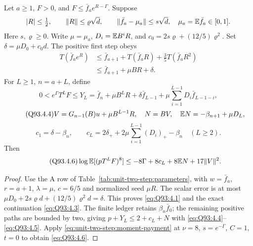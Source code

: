 \begin{lemma}
\label{lem:oc:anchored-eighth}
Let \(a\ge1\), \(F>0\), and
\(F\le\bar f_a e^{R-\Gamma}\). Suppose
\[
 |R|\le\tfrac12,\qquad \|R\|\le\varrho\sqrt d,\qquad
 \|\bar f_a-\mu_a\|\le s\sqrt d,
 \quad \mu_a=\mathbb E\bar f_a\in[0,1].
\]
Here \(s,\varrho\ge0\).
Write \(\mu=\mu_a\), \(D_i=\mathbb E B^iR\), and
\(c_0=2s\varrho+(12/5)\varrho^2\). Set
\(\delta=\mu D_0+c_0d\). The positive first step obeys
\begin{equation}\tag{Q93.4.1}\label{eq:Q93:4.1}
 \begin{aligned}
 T(\bar f_ae^R)&\le\bar f_{a+1}+T(\bar f_aR)
                         +\tfrac35T(\bar f_aR^2)\\
 &\le\bar f_{a+1}+\mu BR+\delta.
 \end{aligned}
\end{equation}
For \(L\ge1\), \(n=a+L\), define
\begin{equation}\tag{Q93.4.3}\label{eq:Q93:4.3}
 0<e^\Gamma T^LF\le Y_L
 =\bar f_n+\mu B^LR+\delta\bar f_{L-1}
       +\mu\sum_{i=1}^{L-1}D_i\bar f_{L-1-i},
\end{equation}
\begin{equation}\tag{Q93.4.4}\label{eq:Q93:4.4}
 V=G_{n-1}(B)u+\mu B^{L-1}R,\quad N=BV,\quad
 \mathbb E N=-\beta_{n+1}+\mu D_L,
\end{equation}
\begin{equation}\tag{Q93.4.5}\label{eq:Q93:4.5}
 c_1=\delta-\beta_n,\qquad
 c_L=2\delta_++2\mu\sum_{i=1}^{L-1}(D_i)_+-\beta_n\quad(L\ge2).
\end{equation}
Then
\begin{equation}\tag{Q93.4.6}\label{eq:Q93:4.6}
 \log\mathbb E[(pT^LF)^8]
 \le-8\Gamma+8c_L+8\mathbb E N+17\|V\|^2.
\end{equation}
\end{lemma}
\begin{proof}
Use the A row of Table~\ref{tab:unit-two-step:parameters}, with
$w=\bar f_a$, $r=a+1$, $\lambda=\mu$, $c=6/5$ and
normalized seed $\mu R$. The scalar error is at most
$\mu D_0+2s\varrho d+(12/5)\varrho^2d=\delta$.
This proves \eqref{eq:Q93:4.1} and the exact continuation
\eqref{eq:Q93:4.3}. The finite ledger retains $\beta_n\bar f_0$;
the remaining positive paths are bounded by two, giving
$p+Y_L\le2+c_L+N$ with \eqref{eq:Q93:4.4}--\eqref{eq:Q93:4.5}.
Apply \eqref{eq:unit-two-step:moment-payment} at $\nu=8$,
$s=e^{-\Gamma}$, $C=1$, $t=0$ to obtain
\eqref{eq:Q93:4.6}.
\end{proof}
